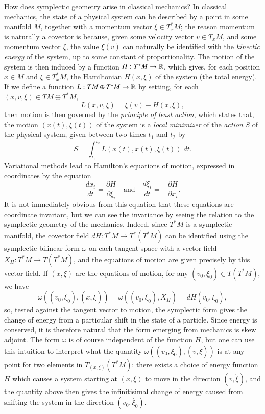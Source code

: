 How does symplectic geometry arise in classical mechanics? In classical mechanics, the state of a physical system can be described by a point in some manifold $M$, together with a momentum vector $\xi \in T^*_x M$; the reason momentum is naturally a covector is because, given some velocity vector $v \in T_xM$, and some momentum vector $\xi$, the value $\xi(v)$ can naturally be identified with the \emph{kinectic energy} of the system, up to some constant of proportionality. The motion of the system is then induced by a function $H: T^* M \to \operatorname{\mathbb{R}}$, which gives, for each position $x \in M$ and $\xi \in T^*_xM$, the Hamiltonian $H(x,\xi)$ of the system (the total energy). If we define a function $L: TM \oplus T^*M \to \operatorname{\mathbb{R}}$ by setting, for each $(x,v,\xi) \in TM \oplus T^*M$,
%
\[ L(x,v,\xi) = \xi(v) - H(x,\xi), \]
%
then motion is then governed by the \emph{principle of least action}, which states that, the motion $(x(t), \xi(t))$ of the system is a \emph{local minimizer} of the \emph{action} $S$ of the physical system, given between two times $t_1$ and $t_2$ by
%
\[ S = \int_{t_1}^{t_2} L(x(t), \dot{x}(t), \xi(t))\; dt. \]
%
Variational methods lead to Hamilton's equations of motion, expressed in coordinates by the equation
%
\[ \frac{dx_i}{dt} = \frac{\partial H}{\partial \xi_i} \quad\text{and}\quad \frac{d\xi_i}{dt} = - \frac{\partial H}{\partial x_i}. \]
%
It is not immediately obvious from this equation that these equations are coordinate invariant, but we can see the invariance by seeing the relation to the symplectic geometry of the mechanics. Indeed, since $T^* M$ is a symplectic manifold, the covector field $dH: T^* M \to T^*(T^* M)$ can be identified using the symplectic bilinear form $\omega$ on each tangent space with a vector field $X_H: T^* M \to T(T^* M)$, and the equations of motion are given precisely by this vector field. If $(x,\xi)$ are the equations of motion, for any $(v_0,\dot{\xi}_0) \in T(T^*M)$, we have
%
\[ \omega( (v_0,\dot{\xi_0}), (\dot{x}, \dot{\xi}) ) = \omega((v_0,\dot{\xi}_0), X_H) = dH(v_0, \dot{\xi}_0), \]
%
so, tested against the tangent vector to motion, the symplectic form gives the change of energy from a particular shift in the state of a particle. Since energy is conserved, it is therefore natural that the form emerging from mechanics is skew adjoint. The form $\omega$ is of course independent of the function $H$, but one can use this intuition to interpret what the quantity $\omega((v_0,\dot{\xi_0}), (v,\dot{\xi}))$ is at any point for two elements in $T_{(x,\xi)}(T^* M)$; there exists a choice of energy function $H$ which causes a system starting at $(x,\xi)$ to move in the direction $(v,\dot{\xi})$, and the quantity above then gives the infinitisimal change of energy caused from shifting the system in the direction $(v_0,\dot{\xi_0})$.

